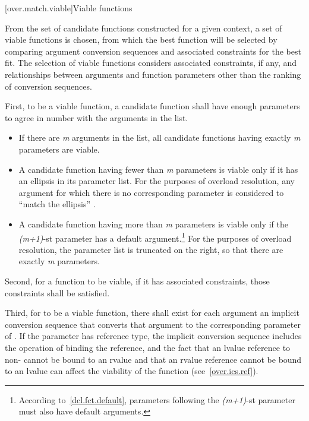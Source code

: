 [over.match.viable]{Viable functions}%

\pnum
From the set of candidate functions constructed for a given
context, a set of viable functions is
chosen, from which the best function will be selected by
comparing argument conversion sequences
and associated constraints
for the best fit.
The selection of viable functions considers
associated constraints, if any, and
relationships between arguments and function parameters other
than the ranking of conversion sequences.

\pnum
{}%
%
First, to be a viable function, a candidate function shall have
enough parameters to agree in number with the arguments in the
list.

\begin{itemize}
\item
If there are
\textit{m}
arguments in the list, all candidate
functions having exactly
\textit{m}
parameters are viable.
\item
A candidate function having fewer than
\textit{m}
parameters is
viable only if it has an ellipsis in its parameter list.
For the purposes of overload resolution,
any argument for which there is no corresponding parameter is
considered to ``match the ellipsis'' .
\item
A candidate function having more than
\textit{m}
parameters is viable
only if the
\textit{(m+1)}-st
parameter has a default
argument.\footnote{According to~\ref{dcl.fct.default},
parameters following the
\textit{(m+1)}-st
parameter must also have default arguments.}
For the purposes of overload
resolution, the parameter list is truncated on the right, so
that there are exactly
\textit{m}
parameters.
\end{itemize}

\pnum
Second, for a function to be viable, if it has associated constraints,
those constraints shall be satisfied.

\pnum
Third, for
to be a viable function, there shall exist for each
argument an
implicit conversion sequence that
converts that argument to the corresponding parameter of
.
If the parameter has reference type, the implicit conversion sequence
includes the operation of binding the reference, and the fact that
an lvalue reference to non- cannot be bound to an rvalue
and that an rvalue reference cannot be bound to an lvalue
can affect
the viability of the function (see~\ref{over.ics.ref}).

